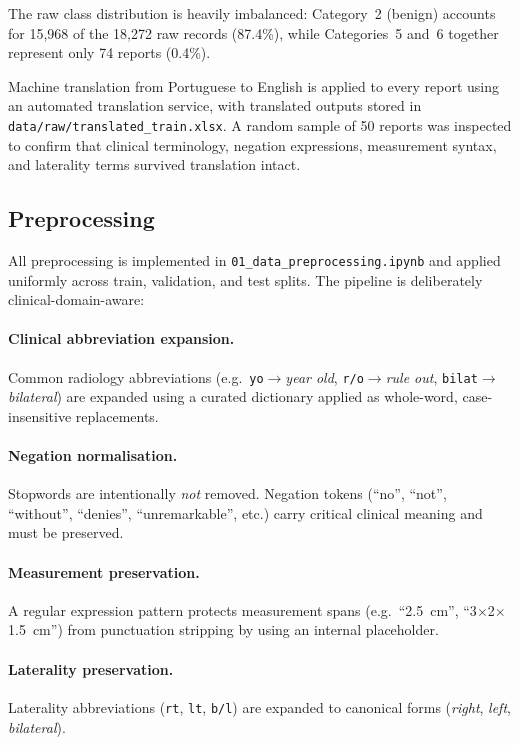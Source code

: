 \documentclass[11pt,a4paper]{article}
\begin{document}
The raw class distribution is heavily imbalanced: Category~2 (benign) accounts
for 15{,}968 of the 18{,}272 raw records (87.4\%), while Categories~5 and~6
together represent only 74 reports (0.4\%).

Machine translation from Portuguese to English is applied to every report using
an automated translation service, with translated outputs stored in
\texttt{data/raw/translated\_train.xlsx}.
A random sample of 50 reports was inspected to confirm that clinical terminology,
negation expressions, measurement syntax, and laterality terms survived
translation intact.

\subsection{Preprocessing}

All preprocessing is implemented in \texttt{01\_data\_preprocessing.ipynb} and
applied uniformly across train, validation, and test splits.
The pipeline is deliberately clinical-domain-aware:

\paragraph{Clinical abbreviation expansion.}
Common radiology abbreviations (e.g.\ \texttt{yo}$\to$\textit{year old},
\texttt{r/o}$\to$\textit{rule out}, \texttt{bilat}$\to$\textit{bilateral})
are expanded using a curated dictionary applied as whole-word, case-insensitive
replacements.

\paragraph{Negation normalisation.}
Stopwords are intentionally \emph{not} removed.
Negation tokens (``no'', ``not'', ``without'', ``denies'', ``unremarkable'',
etc.) carry critical clinical meaning and must be preserved.

\paragraph{Measurement preservation.}
A regular expression pattern protects measurement spans
(e.g.\ ``2.5~cm'', ``3$\times$2$\times$1.5~cm'') from punctuation stripping
by using an internal placeholder.

\paragraph{Laterality preservation.}
Laterality abbreviations (\texttt{rt}, \texttt{lt}, \texttt{b/l}) are expanded
to canonical forms (\textit{right}, \textit{left}, \textit{bilateral}).
\end{document}
